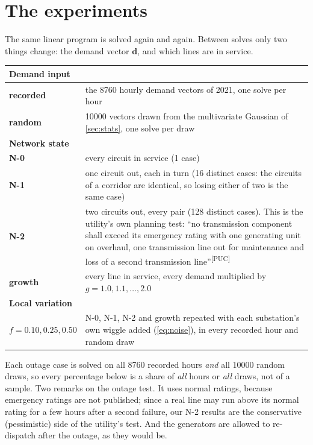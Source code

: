 \documentclass[11pt,a4paper]{article}
\newcommand{\src}[1]{\textsuperscript{[#1]}}
\begin{document}
\section{The experiments}
\label{sec:exp}

The same linear program is solved again and again. Between solves only two things
change: the demand vector $\mathbf{d}$, and which lines are in service.

\begin{center}
\small
\begin{tabular}{@{}lp{}@{}}
\toprule
\textbf{Demand input} & \\
\midrule
\textbf{recorded} & the \num{8760} hourly demand vectors of 2021, one solve per hour \\
\textbf{random}   & \num{10000} vectors drawn from the multivariate Gaussian of
                    \cref{sec:stats}, one solve per draw \\
\midrule
\textbf{Network state} & \\
\midrule
\textbf{N-0} & every circuit in service (1 case) \\
\textbf{N-1} & one circuit out, each in turn (16 distinct cases: the circuits of a
               corridor are identical, so losing either of two is the same case) \\
\textbf{N-2} & two circuits out, every pair (128 distinct cases). This is the
               utility's own planning test: ``no transmission component shall exceed its
               emergency rating with one generating unit on overhaul, one transmission
               line out for maintenance and loss of a second transmission
               line''\src{PUC} \\
\textbf{growth} & every line in service, every demand multiplied by
               $g = 1.0, 1.1, \dots, 2.0$ \\
\midrule
\textbf{Local variation} & \\
\midrule
$f = 0.10, 0.25, 0.50$ & N-0, N-1, N-2 and growth repeated with each substation's own
               wiggle added (\cref{eq:noise}), in every recorded hour and random draw \\
\bottomrule
\end{tabular}
\end{center}

Each outage case is solved on all \num{8760} recorded hours \emph{and} all \num{10000}
random draws, so every percentage below is a share of \emph{all} hours or \emph{all}
draws, not of a sample. Two remarks on the outage test. It uses normal ratings, because
emergency ratings are not published; since a real line may run above its normal rating
for a few hours after a second failure, our N-2 results are the conservative
(pessimistic) side of the utility's test. And the generators are allowed to
re-dispatch after the outage, as they would be.
\end{document}
